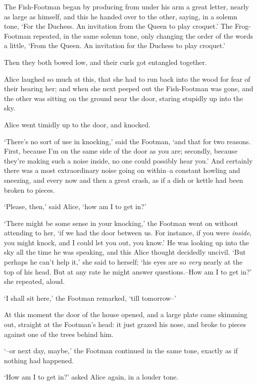   The Fish-Footman began by producing from under his arm a great
letter, nearly as large as himself, and this he handed over to
the other, saying, in a solemn tone, `For the Duchess.  An
invitation from the Queen to play croquet.'  The Frog-Footman
repeated, in the same solemn tone, only changing the order of the
words a little, `From the Queen.  An invitation for the Duchess
to play croquet.'

  Then they both bowed low, and their curls got entangled
together.

  Alice laughed so much at this, that she had to run back into
the wood for fear of their hearing her; and when she next peeped
out the Fish-Footman was gone, and the other was sitting on the
ground near the door, staring stupidly up into the sky.

  Alice went timidly up to the door, and knocked.

  `There's no sort of use in knocking,' said the Footman, `and
that for two reasons.  First, because I'm on the same side of the
door as you are; secondly, because they're making such a noise
inside, no one could possibly hear you.'  And certainly there was
a most extraordinary noise going on within--a constant howling
and sneezing, and every now and then a great crash, as if a dish
or kettle had been broken to pieces.

  `Please, then,' said Alice, `how am I to get in?'

  `There might be some sense in your knocking,' the Footman went
on without attending to her, `if we had the door between us.  For
instance, if you were {\it inside}, you might knock, and I could let
you out, you know.'  He was looking up into the sky all the time
he was speaking, and this Alice thought decidedly uncivil.  `But
perhaps he can't help it,' she said to herself; `his eyes are so
{\it very} nearly at the top of his head.  But at any rate he might
answer questions.--How am I to get in?' she repeated, aloud.

  `I shall sit here,' the Footman remarked, `till tomorrow--'

  At this moment the door of the house opened, and a large plate
came skimming out, straight at the Footman's head:  it just
grazed his nose, and broke to pieces against one of the trees
behind him.

  `--or next day, maybe,' the Footman continued in the same tone,
exactly as if nothing had happened.

  `How am I to get in?' asked Alice again, in a louder tone.

